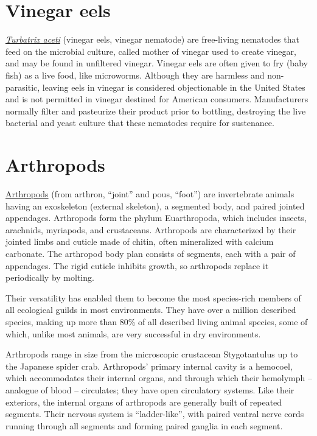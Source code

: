 \section{Vinegar eels}\label{vinegar-eels}

\href{https://en.wikipedia.org/wiki/Turbatrix_aceti}{\emph{Turbatrix
aceti}} (vinegar eels, vinegar nematode) are free-living nematodes that
feed on the microbial culture, called mother of vinegar used to create
vinegar, and may be found in unfiltered vinegar. Vinegar eels are often
given to fry (baby fish) as a live food, like microworms. Although they
are harmless and non-parasitic, leaving eels in vinegar is considered
objectionable in the United States and is not permitted in vinegar
destined for American consumers. Manufacturers normally filter and
pasteurize their product prior to bottling, destroying the live
bacterial and yeast culture that these nematodes require for sustenance.

\section{Arthropods}\label{arthropods}

\href{https://en.wikipedia.org/wiki/Arthropod}{Arthropods} (from
arthron, ``joint'' and pous, ``foot'') are invertebrate animals having
an exoskeleton (external skeleton), a segmented body, and paired jointed
appendages. Arthropods form the phylum Euarthropoda, which includes
insects, arachnids, myriapods, and crustaceans. Arthropods are
characterized by their jointed limbs and cuticle made of chitin, often
mineralized with calcium carbonate. The arthropod body plan consists of
segments, each with a pair of appendages. The rigid cuticle inhibits
growth, so arthropods replace it periodically by molting.

Their versatility has enabled them to become the most species-rich
members of all ecological guilds in most environments. They have over a
million described species, making up more than 80\% of all described
living animal species, some of which, unlike most animals, are very
successful in dry environments.

Arthropods range in size from the microscopic crustacean Stygotantulus
up to the Japanese spider crab. Arthropods' primary internal cavity is a
hemocoel, which accommodates their internal organs, and through which
their hemolymph -- analogue of blood -- circulates; they have open
circulatory systems. Like their exteriors, the internal organs of
arthropods are generally built of repeated segments. Their nervous
system is ``ladder-like'', with paired ventral nerve cords running
through all segments and forming paired ganglia in each segment.

